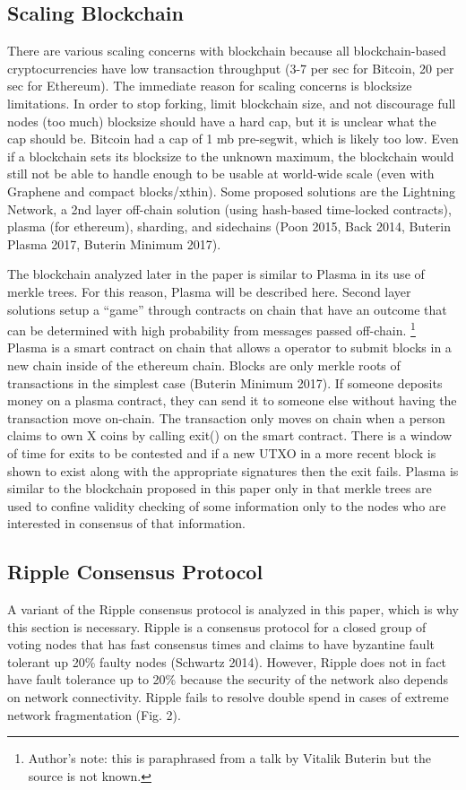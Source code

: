 \documentclass[letterpaper, 10 pt, conference]{ieeeconf}  %
\begin{document}
\subsection{Scaling Blockchain}
There are various scaling concerns with blockchain because all blockchain-based cryptocurrencies have low transaction throughput (3-7 per sec for Bitcoin, 20 per sec for Ethereum). The immediate reason for scaling concerns is blocksize limitations. In order to stop forking, limit blockchain size, and not discourage full nodes (too much) blocksize should have a hard cap, but it is unclear what the cap should be. Bitcoin had a cap of 1 mb pre-segwit, which is likely too low. Even if a blockchain sets its blocksize to the unknown maximum, the blockchain would still not be able to handle enough to be usable at world-wide scale (even with Graphene and compact blocks/xthin). Some proposed solutions are the Lightning Network, a 2nd layer off-chain solution (using hash-based time-locked contracts), plasma (for ethereum), sharding, and sidechains (Poon 2015, Back 2014, Buterin Plasma 2017, Buterin Minimum 2017). 

The blockchain analyzed later in the paper is similar to Plasma in its use of merkle trees. For this reason, Plasma will be described here. Second layer solutions setup a “game” through contracts on chain that have an outcome that can be determined with high probability from messages passed off-chain. \footnote{Author's note: this is paraphrased from a talk by Vitalik Buterin but the source is not known.} Plasma is a smart contract on chain that allows a operator to submit blocks in a new chain inside of the ethereum chain. Blocks are only merkle roots of transactions in the simplest case (Buterin Minimum 2017). If someone deposits money on a plasma contract, they can send it to someone else without having the transaction move on-chain. The transaction only moves on chain when a person claims to own X coins by calling exit() on the smart contract. There is a window of time for exits to be contested and if a new UTXO in a more recent block is shown to exist along with the appropriate signatures then the exit fails. Plasma is similar to the blockchain proposed in this paper only in that merkle trees are used to confine validity checking of some information only to the nodes who are interested in consensus of that information. 

\subsection{Ripple Consensus Protocol}
A variant of the Ripple consensus protocol is analyzed in this paper, which is why this section is necessary. Ripple is a consensus protocol for a closed group of voting nodes that has fast consensus times and claims to have byzantine fault tolerant up 20\% faulty nodes (Schwartz 2014). However, Ripple does not in fact have fault tolerance up to 20\% because the security of the network also depends on network connectivity. Ripple fails to resolve double spend in cases of extreme network fragmentation (Fig. 2).
\end{document}
